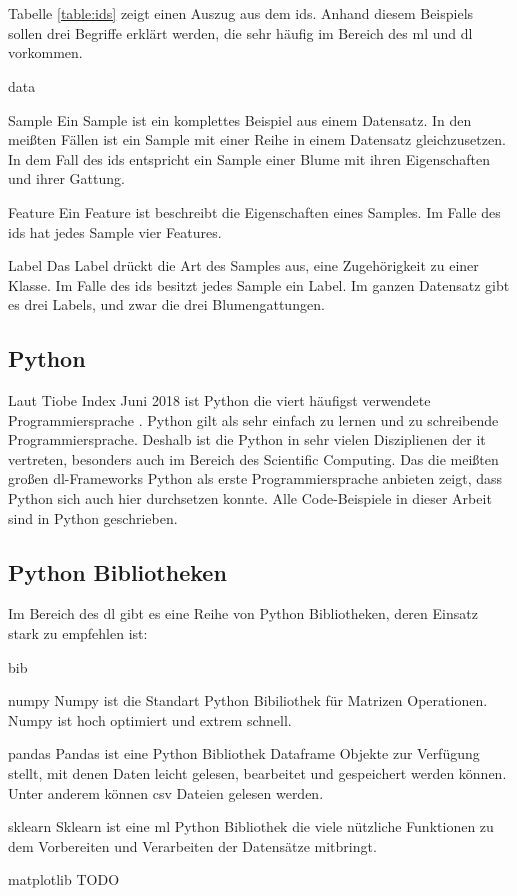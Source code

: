 \documentclass[conference, german]{IEEEtran}
\begin{document}
\\\\
Tabelle \ref{table:ids} zeigt einen Auszug aus dem \ac{ids}.
Anhand diesem Beispiels sollen drei Begriffe erklärt werden, die sehr häufig 
im Bereich des \ac{ml} und \ac{dl} vorkommen.
\begin{mdframed}[backgroundcolor=lightgray]
\begin{labeling}{data}
	\item [Sample] Ein Sample ist ein komplettes Beispiel aus einem Datensatz. 
	In den meißten Fällen ist ein Sample mit einer Reihe in einem Datensatz gleichzusetzen.
	In dem Fall des \ac{ids} entspricht ein Sample einer Blume mit ihren Eigenschaften und ihrer Gattung.
	\item [Feature] Ein Feature ist beschreibt die Eigenschaften eines Samples.
	Im Falle des \ac{ids} hat jedes Sample vier Features.
	\item [Label] Das Label drückt die Art des Samples aus, eine Zugehörigkeit zu einer Klasse.
	Im Falle des \ac{ids} besitzt jedes Sample ein Label. 
	Im ganzen Datensatz gibt es drei Labels, und zwar die drei Blumengattungen.
\end{labeling}
\end{mdframed}

\subsection{Python}
Laut Tiobe Index Juni 2018 ist Python die viert häufigst verwendete Programmiersprache \citep[vgl.][]{TIOBE}. Python gilt als sehr einfach zu lernen und zu schreibende Programmiersprache. Deshalb ist die Python in sehr vielen Disziplienen der \ac{it} vertreten,
besonders auch im Bereich des Scientific Computing. Das die meißten großen \ac{dl}-Frameworks Python als erste Programmiersprache anbieten zeigt, dass Python sich auch hier durchsetzen konnte.
Alle Code-Beispiele in dieser Arbeit sind in Python geschrieben.
\subsection{Python Bibliotheken}
Im Bereich des \ac{dl} gibt es eine Reihe von Python Bibliotheken, deren Einsatz stark zu empfehlen ist:
\begin{mdframed}[backgroundcolor=lightgray]
\begin{labeling}{bib}
	\item [numpy] Numpy ist die Standart Python Bibiliothek für Matrizen Operationen.
	Numpy ist hoch optimiert und extrem schnell. 
	\item [pandas] Pandas ist eine Python Bibliothek Dataframe Objekte zur Verfügung stellt,
	mit denen Daten leicht gelesen, bearbeitet und gespeichert werden können. Unter anderem können \ac{csv} Dateien gelesen werden.
	\item [sklearn] Sklearn ist eine \ac{ml} Python Bibliothek die viele nützliche Funktionen zu dem Vorbereiten und Verarbeiten der Datensätze mitbringt.
	\item [matplotlib] TODO
\end{labeling}
\end{mdframed}
\end{document}
